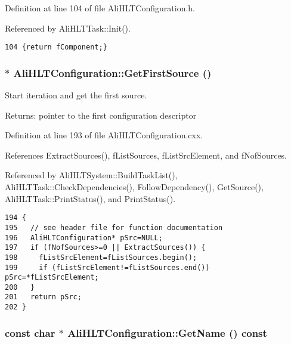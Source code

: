 Definition at line 104 of file Ali\-HLTConfiguration.h.

Referenced by Ali\-HLTTask::Init().

\footnotesize\begin{verbatim}104 {return fComponent;}
\end{verbatim}\normalsize 


\subsubsection{ $\ast$ Ali\-HLTConfiguration::Get\-First\-Source ()}\label{classAliHLTConfiguration_a12}


Start iteration and get the first source. \begin{Desc}
\item[Returns:]pointer to the first configuration descriptor \end{Desc}


Definition at line 193 of file Ali\-HLTConfiguration.cxx.

References Extract\-Sources(), f\-List\-Sources, f\-List\-Src\-Element, and f\-Nof\-Sources.

Referenced by Ali\-HLTSystem::Build\-Task\-List(), Ali\-HLTTask::Check\-Dependencies(), Follow\-Dependency(), Get\-Source(), Ali\-HLTTask::Print\-Status(), and Print\-Status().

\footnotesize\begin{verbatim}194 {
195   // see header file for function documentation
196   AliHLTConfiguration* pSrc=NULL;
197   if (fNofSources>=0 || ExtractSources()) {
198     fListSrcElement=fListSources.begin();
199     if (fListSrcElement!=fListSources.end()) pSrc=*fListSrcElement;
200   } 
201   return pSrc;
202 }
\end{verbatim}\normalsize 


\subsubsection{\setlength{\rightskip}{0pt plus 5cm}const char $\ast$ Ali\-HLTConfiguration::Get\-Name () const}\label{classAliHLTConfiguration_a5}


